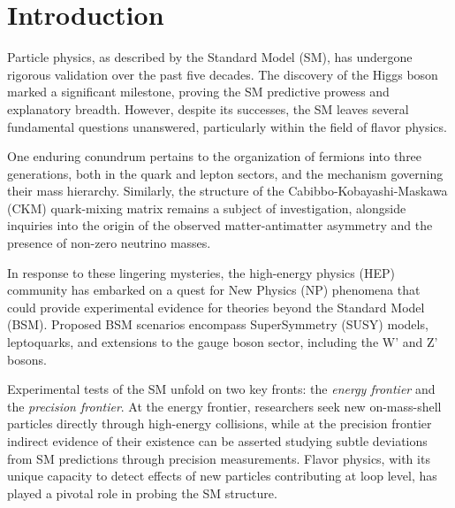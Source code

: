 \renewcommand{\chaptermark}[1]{\markboth{#1}{}}
\renewcommand{\sectionmark}[1]{\markright{#1}}
\fancyhead{} %
\fancyhead[LE]{\chaptername~\thechapter | \leftmark}
\fancyhead[RO]{\thesection~\rightmark}
\fancyfoot{} %
\fancyfoot[LE,RO]{\thepage}

    
\chapter{Introduction}
\label{chp:intro}

Particle physics, as described by the Standard Model (SM), has undergone rigorous validation over the past five decades. The discovery of the Higgs boson~~\cite{Aad_2012, Chatrchyan_2012} marked a significant milestone, proving the SM predictive prowess and explanatory breadth. However, despite its successes, the SM leaves several fundamental questions unanswered, particularly within the field of flavor physics.

One enduring conundrum pertains to the organization of fermions into three generations, both in the quark and lepton sectors, and the mechanism governing their mass hierarchy. Similarly, the structure of the Cabibbo-Kobayashi-Maskawa (CKM) quark-mixing matrix remains a subject of investigation, alongside inquiries into the origin of the observed matter-antimatter asymmetry and the presence of non-zero neutrino masses.

In response to these lingering mysteries, the high-energy physics (HEP) community has embarked on a quest for New Physics (NP) phenomena that could provide experimental evidence for theories beyond the Standard Model (BSM). Proposed BSM scenarios encompass SuperSymmetry (SUSY) models, leptoquarks, and extensions to the gauge boson sector, including the W’ and Z’ bosons.

Experimental tests of the SM unfold on two key fronts: the \textit{energy frontier} and the \textit{precision frontier}. At the energy frontier, researchers seek new on-mass-shell particles directly through high-energy collisions, while at the precision frontier indirect evidence of their existence can be asserted studying subtle deviations from SM predictions through precision measurements. Flavor physics, with its unique capacity to detect effects of new particles contributing at loop level, has played a pivotal role in probing the SM structure.

